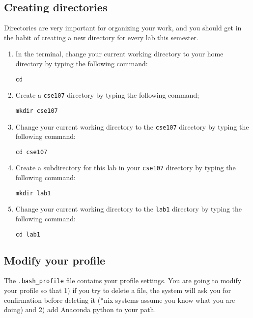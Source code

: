\documentclass[12pt]{article}
\begin{document}
\subsection{Creating directories}
Directories are very important for organizing your work, and you should get in the habit of creating a new directory for every lab this semester.

\begin{enumerate}

\item In the terminal, change your current working directory to your home directory by typing the following command:
\begin{lstlisting}[style=bash]
cd
\end{lstlisting}

\item Create a \texttt{cse107} directory by typing the following command;
\begin{lstlisting}[style=bash]
mkdir cse107
\end{lstlisting}

\item Change your current working directory to the \texttt{cse107} directory by typing the following command:
\begin{lstlisting}[style=bash]
cd cse107
\end{lstlisting}

\item Create a subdirectory for this lab in your \texttt{cse107} directory by typing the following command:
\begin{lstlisting}[style=bash]
mkdir lab1
\end{lstlisting}

\item Change your current working directory to the \texttt{lab1} directory by typing the following command:
\begin{lstlisting}[style=bash]
cd lab1
\end{lstlisting}

\end{enumerate}


\subsection{Modify your profile}
The \texttt{.bash\_profile} file contains your profile settings. You are going to modify your profile so that 1) if you try to delete a file, the system will ask you for confirmation before deleting it (*nix systems assume you know what you are doing) and 2) add Anaconda python to your path.
\end{document}
